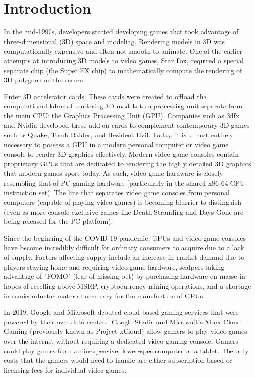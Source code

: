 \documentclass[titlepage, 12pt]{article}
\begin{document}
\newpage

\tableofcontents

\newpage

\section{Introduction}

In the mid-1990s, developers started developing games that took advantage of three-dimensional (3D) space and modeling. Rendering models in 3D was computationally expensive and often not smooth to animate. One of the earlier attempts at introducing 3D models to video games, Star Fox, required a special separate chip (the Super FX chip) to mathematically compute the rendering of 3D polygons on the screen.

Enter 3D accelerator cards. These cards were created to offload the computational labor of rendering 3D models to a processing unit separate from the main CPU: the Graphics Processing Unit (GPU). Companies such as 3dfx and Nvidia developed these add-on cards to complement contemporary 3D games such as Quake, Tomb Raider, and Resident Evil. Today, it is almost entirely necessary to possess a GPU in a modern personal computer or video game console to render 3D graphics effectively. Modern video game consoles contain proprietary GPUs that are dedicated to rendering the highly detailed 3D graphics that modern games sport today. As such, video game hardware is closely resembling that of PC gaming hardware (particularly in the shared x86-64 CPU instruction set). The line that separates video game consoles from personal computers (capable of playing video games) is becoming blurrier to distinguish (even as more console-exclusive games like Death Stranding and Days Gone are being released for the PC platform).

Since the beginning of the COVID-19 pandemic, GPUs and video game consoles have become incredibly difficult for ordinary consumers to acquire due to a lack of supply. Factors affecting supply include an increase in market demand due to players staying home and requiring video game hardware, scalpers taking advantage of "FOMO" (fear of missing out) by purchasing hardware en masse in hopes of reselling above MSRP, cryptocurrency mining operations, and a shortage in semiconductor material necessary for the manufacture of GPUs.

In 2019, Google and Microsoft debuted cloud-based gaming services that were powered by their own data centers. Google Stadia and Microsoft’s Xbox Cloud Gaming (previously known as Project xCloud) allow gamers to play video games over the internet without requiring a dedicated video gaming console. Gamers could play games from an inexpensive, lower-spec computer or a tablet. The only costs that the gamers would need to handle are either subscription-based or licensing fees for individual video games.
\end{document}
